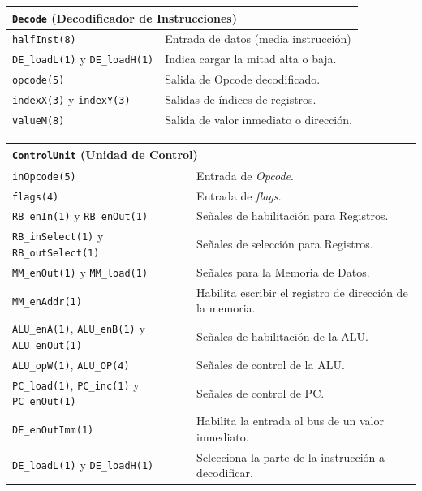 \documentclass[a4paper,11pt]{article}
\begin{document}
\begin{center}
\begin{tabular}{p{6.4cm}|p{8.2cm}}
\multicolumn{2}{l}{ \texttt{Decode} (Decodificador de Instrucciones) }\\ %
\hline
\texttt{halfInst(8)}                          & Entrada de datos (media instrucción)\\
\texttt{DE\_loadL(1)} y \texttt{DE\_loadH(1)} & Indica cargar la mitad alta o baja.\\
\texttt{opcode(5)}                            & Salida de Opcode decodificado.\\
\texttt{indexX(3)} y \texttt{indexY(3)}       & Salidas de índices de registros.\\
\texttt{valueM(8)}                            & Salida de valor inmediato o dirección.\\
\end{tabular}
\end{center}

\begin{center}
\begin{tabular}{p{6.4cm}|p{8.2cm}}
\multicolumn{2}{l}{ \texttt{ControlUnit} (Unidad de Control) }\\ %
\hline
\texttt{inOpcode(5)}                                                 & Entrada de \emph{Opcode}.\\
\texttt{flags(4)}                                                    & Entrada de \emph{flags}.\\
\texttt{RB\_enIn(1)} y \texttt{RB\_enOut(1)}                         & Señales de habilitación para Registros.\\
\texttt{RB\_inSelect(1)} y \texttt{RB\_outSelect(1)}                 & Señales de selección para Registros.\\
\texttt{MM\_enOut(1)} y \texttt{MM\_load(1)}                         & Señales para la Memoria de Datos.\\
\texttt{MM\_enAddr(1)}                                               & Habilita escribir el registro de dirección de la memoria.\\
\texttt{ALU\_enA(1)}, \texttt{ALU\_enB(1)} y \texttt{ALU\_enOut(1)}  & Señales de habilitación de la ALU.\\
\texttt{ALU\_opW(1)}, \texttt{ALU\_OP(4)}                            & Señales de control de la ALU.\\
\texttt{PC\_load(1)}, \texttt{PC\_inc(1)} y \texttt{PC\_enOut(1)}    & Señales de control de PC.\\
\texttt{DE\_enOutImm(1)}                                             & Habilita la entrada al bus de un valor inmediato.\\
\texttt{DE\_loadL(1)} y \texttt{DE\_loadH(1)}                        & Selecciona la parte de la instrucción a decodificar.\\
\end{tabular}
\end{center}
\end{document}
